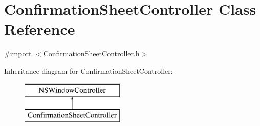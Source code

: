 \hypertarget{interface_confirmation_sheet_controller}{\section{Confirmation\-Sheet\-Controller Class Reference}
\label{interface_confirmation_sheet_controller}
}


{\ttfamily \#import $<$Confirmation\-Sheet\-Controller.\-h$>$}

Inheritance diagram for Confirmation\-Sheet\-Controller\-:\begin{figure}[H]
\begin{center}
\leavevmode
\includegraphics[height=2.000000cm]{interface_confirmation_sheet_controller}
\end{center}
\end{figure}
